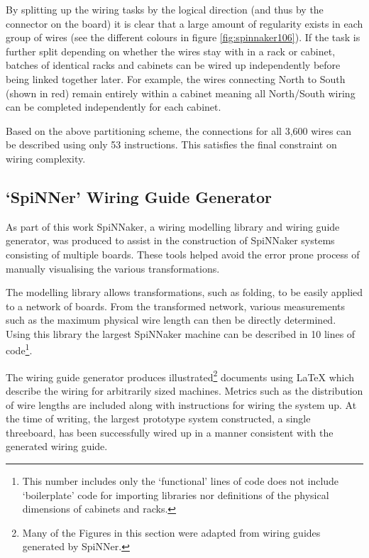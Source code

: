 			By splitting up the wiring tasks by the logical direction (and thus by the
			connector on the board) it is clear that a large amount of regularity
			exists in each group of wires (see the different colours in figure
			\ref{fig:spinnaker106}). If the task is further split depending on whether
			the wires stay with in a rack or cabinet, batches of identical racks and
			cabinets can be wired up independently before being linked together later.
			For example, the wires connecting North to South (shown in red) remain
			entirely within a cabinet meaning all North/South wiring can be completed
			independently for each cabinet.
			
			Based on the above partitioning scheme, the connections for all 3,600
			wires can be described using only 53 instructions. This satisfies the
			final constraint on wiring complexity.
		
		\subsection{`SpiNNer' Wiring Guide Generator}
			
			As part of this work SpiNNaker, a wiring modelling library and wiring
			guide generator, was produced to assist in the construction of SpiNNaker
			systems consisting of multiple boards. These tools helped avoid the error
			prone process of manually visualising the various transformations.
			
			The modelling library allows transformations, such as folding, to be
			easily applied to a network of boards. From the transformed network,
			various measurements such as the maximum physical wire length can then be
			directly determined. Using this library the largest SpiNNaker machine can
			be described in 10 lines of code\footnote{This number includes only the
			`functional' lines of code does not include `boilerplate' code for
			importing libraries nor definitions of the physical dimensions of cabinets
			and racks.}.
			
			The wiring guide generator produces illustrated\footnote{Many of the
			Figures in this section were adapted from wiring guides generated by
			SpiNNer.} documents using \LaTeX{} which describe the wiring for
			arbitrarily sized machines. Metrics such as the distribution of wire
			lengths are included along with instructions for wiring the system up. At
			the time of writing, the largest prototype system constructed, a single
			threeboard, has been successfully wired up in a manner consistent with the
			generated wiring guide.
		
